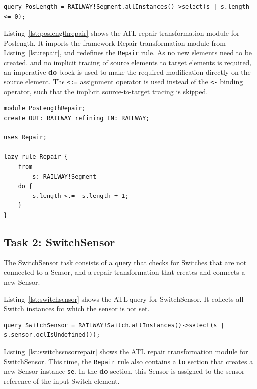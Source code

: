 \documentclass[submission,copyright,creativecommons]{eptcs}
\begin{document}
\lstset{language=atl}
\begin{lstlisting}[float=htb, caption={PosLength query in ATL}, label=lst:poslength, captionpos=b, frame=tb, belowskip=-10pt]
query PosLength = RAILWAY!Segment.allInstances()->select(s | s.length <= 0);
\end{lstlisting}

Listing~\ref{lst:poslengthrepair} shows the ATL repair transformation module for Poslength. It imports the framework Repair transformation module from Listing~\ref{lst:repair}, and redefines the \texttt{Repair} rule. As no new elements need to be created, and no implicit tracing of source elements to target elements is required, an imperative \textbf{do} block is used to make the required modification directly on the source element. The \texttt{<:=} assignment operator is used instead of the \texttt{<-} binding operator, such that the implicit source-to-target tracing is skipped.

\lstset{language=atl}
\begin{lstlisting}[float=htb, caption={PosLength repair transformation module in ATL}, label=lst:poslengthrepair, captionpos=b, frame=tb, belowskip=-10pt]
module PosLengthRepair;
create OUT: RAILWAY refining IN: RAILWAY;

uses Repair;

lazy rule Repair {
	from
		s: RAILWAY!Segment
	do {
		s.length <:= -s.length + 1;
	}
}
\end{lstlisting}

\subsection{Task 2: SwitchSensor}

The SwitchSensor task consists of a query that checks for Switches that are not connected to a Sensor, and a repair transformation that creates and connects a new Sensor. 

Listing~\ref{lst:switchsensor} shows the ATL query for SwitchSensor. It collects all Switch instances for which the sensor is not set.

\lstset{language=atl}
\begin{lstlisting}[float=htb, caption={SwitchSensor query in ATL}, label=lst:switchsensor, captionpos=b, frame=tb, belowskip=-10pt]
query SwitchSensor = RAILWAY!Switch.allInstances()->select(s | s.sensor.oclIsUndefined());
\end{lstlisting}

Listing~\ref{lst:switchsensorrepair} shows the ATL repair transformation module for SwitchSensor. This time, the \texttt{Repair} rule also contains a \textbf{to} section that creates a new Sensor instance \texttt{se}. In the \textbf{do} section, this Sensor is assigned to the sensor reference of the input Switch element.
\end{document}

